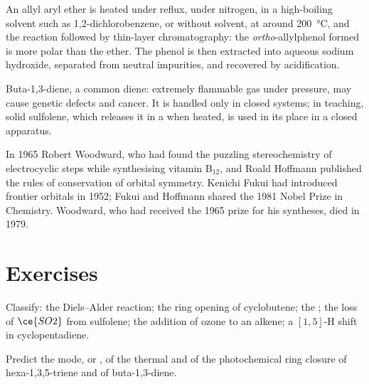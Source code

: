 \begin{inthelab}
An allyl aryl ether is heated under reflux, under nitrogen, in a high-boiling
solvent such as 1,2-dichlorobenzene, or without solvent, at around \qty{200}{\celsius}, and
the reaction followed by thin-layer chromatography: the \textit{ortho}-allylphenol formed
is more polar than the ether. The phenol is then extracted into aqueous sodium
hydroxide, separated from neutral impurities, and recovered by acidification.
\end{inthelab}

\begin{safety}{}
Buta-1,3-diene, a common diene: extremely flammable gas under pressure, may cause
genetic defects and cancer. It is handled only in closed systems; in teaching,
solid sulfolene, which releases it in a  when heated, is used
in its place in a closed apparatus.
\end{safety}

\begin{history}
In 1965 Robert Woodward, who had found the puzzling stereochemistry of
electrocyclic steps while synthesising vitamin B$_{12}$, and Roald Hoffmann published
the rules of conservation of orbital symmetry. Kenichi Fukui had introduced
frontier orbitals in 1952; Fukui and Hoffmann shared the 1981 Nobel Prize in
Chemistry. Woodward, who had received the 1965 prize for his syntheses, died in
1979.
\end{history}

\section{Exercises}

\begin{exercise}[$\star$]\label{exo:b3:pericyclic:1}
Classify: the Diels--Alder reaction; the ring opening of cyclobutene; the ; the loss of $\ce{SO2}$ from sulfolene; the addition of ozone to an alkene;
a $[1,5]$-H shift in cyclopentadiene.
\end{exercise}

\begin{exercise}[$\star$]\label{exo:b3:pericyclic:2}
Predict the mode,  or , of the thermal and of the
photochemical ring closure of hexa-1,3,5-triene and of buta-1,3-diene.
\end{exercise}


